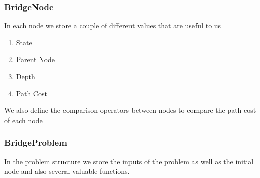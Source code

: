 \documentclass[12pt]{diazessay}
\begin{document}
        \subsubsection{BridgeNode}
            In each node we store a couple of different values that are useful to us
            \begin{enumerate}
                \item State
                \item Parent Node
                \item Depth
                \item Path Cost
            \end{enumerate}
            We also define the comparison operators between nodes to compare the path cost of each node
        \subsubsection{BridgeProblem}
            In the problem structure we store the inputs of the problem as well as the initial node and also several valuable functions.
\end{document}
